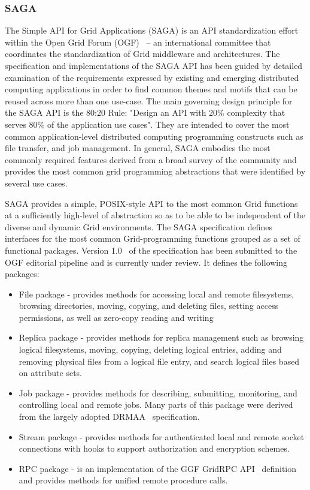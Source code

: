 \documentclass[conference,final]{IEEEtran}
\begin{document}
\subsubsection{SAGA}

The Simple API for Grid Applications (SAGA) is an API standardization
effort within the Open Grid Forum (OGF)~\cite{ogf_web} -- an
international committee that coordinates the standardization of Grid
middleware and architectures.  The specification and implementations
of the SAGA API has been guided by detailed examination of the
requirements expressed by existing and emerging distributed computing
applications in order to find common themes and motifs that can be
reused across more than one use-case.  The main governing design
principle for the SAGA API is the 80:20 Rule: "Design an API with 20\%
complexity that serves 80\% of the application use cases".  They are
intended to cover the most common application-level distributed
computing programming constructs such as file transfer, and job
management.  In general, SAGA embodies the most commonly required
features derived from a broad survey of the community and provides the
most common grid programming abstractions that were identified by
several use cases.

SAGA provides a simple, POSIX-style API to the most common Grid
functions at a sufficiently high-level of abstraction so as to be able
to be independent of the diverse and dynamic Grid environments.  The
SAGA specification defines interfaces for the most common
Grid-programming functions grouped as a set of functional packages.
Version 1.0~\cite{saga-core} of the specification has been submitted
to the OGF editorial pipeline and is currently under review.  It
defines the following packages:

\begin{itemize}
\item File package - provides methods for accessing local and remote
  filesystems, browsing directories, moving, copying, and deleting
  files, setting access permissions, as well as zero-copy reading and
  writing
\item Replica package - provides methods for replica management such
  as browsing logical filesystems, moving, copying, deleting logical
  entries, adding and removing physical files from a logical file
  entry, and search logical files based on attribute sets.
\item Job package - provides methods for describing, submitting,
  monitoring, and controlling local and remote jobs. Many parts of
  this package were derived from the largely adopted
  DRMAA~\cite{drmaa_url} specification.
\item Stream package - provides methods for authenticated local and
  remote socket connections with hooks to support authorization and
  encryption schemes.
\item RPC package - is an implementation of the GGF GridRPC
  API~\cite{gridrpc_url} definition and provides methods for unified
  remote procedure calls.
\end{itemize}
\end{document}
